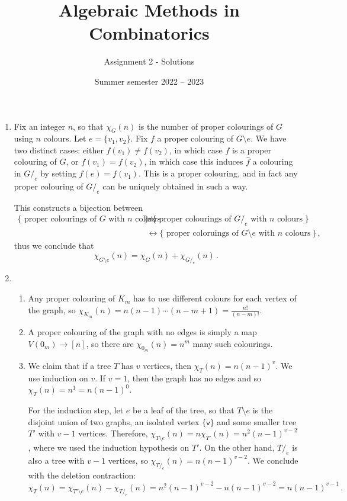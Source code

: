 \documentclass[kulak]{tplt}
\title{Algebraic Methods in Combinatorics}
\author{Assignment 2 - Solutions}
\date{Summer semester 2022 -- 2023}
\theoremstyle{definition}
\newcommand{\vv}{\mathsf{v}}
\begin{document}
\maketitle
\begin{enumerate}
\item 
Fix an integer $n$, so that $\chi_G(n)$ is the number of proper colourings of $G$ using $n$ colours.
Let $e = \{v_1, v_2\}$.
Fix $f$ a proper colouring of $G\setminus e$.
We have two distinct cases: either $f(v_1) \neq f(v_2)$, in which case $f$ is a proper colouring of $G$, or $f(v_1) = f(v_2)$, in which case this induces $\hat{f}$ a colouring in $G/_e$ by setting $f(e) = f(v_1)$.
This is a proper colouring, and in fact any proper colouring of $G/_e$ can be uniquely obtained in such a way.

This constructs a bijection between
\begin{align*}
 \{ \text{ proper colourings of $G$ with $n$ colours }\} &\uplus \{ \text{ proper colourings of $G/_e$ with $n$ colours }\} \\
 &\leftrightarrow \{ \text{ proper coloruings of $G\setminus e$ with $n$ colours }\}\, , 
\end{align*}
thus we conclude that 
$$ \chi_{G\setminus e }(n) = \chi_G(n) + \chi_{G/_e}(n)\, . $$

\item 
\begin{enumerate}
\item 
Any proper colouring of $K_m$ has to use different colours for each vertex of the graph, so $\chi_{K_m}(n) = n(n-1) \cdots (n-m+1) = \frac{n!}{(n-m)!}$.

\item 
A proper colouring of the graph with no edges is simply a map $V(0_m) \to [n]$, so there are $\chi_{0_m}(n) = n^m$ many such colourings.


\item 
We claim that if a tree $T$ has $v$ vertices, then $\chi_T(n) = n(n-1)^v$.
We use induction on $v$.
If $v=1$, then the graph has no edges and so $\chi_T(n) = n^1 = n (n-1)^0$.

For the induction step, let $e$ be a leaf of the tree, so that $T\setminus e$ is the disjoint union of two graphs, an isolated vertex $\{\vv\}$ and some smaller tree $T'$ with $v-1$ vertices.
Therefore, $\chi_{T \setminus e}(n) = n \chi_{T'}(n) = n^2(n-1)^{v-2}$, where we used the induction hypothesis on $T'$.
On the other hand, $T/_e$ is also a tree with $v-1$ vertices, so $\chi_{T/_e}(n) = n (n-1)^{v-2}$.
We conclude with the deletion contraction:
$$\chi_T(n) = \chi_{T'\setminus e}(n) - \chi_{T/_e}(n) = n^2(n-1)^{v-2}  - n(n-1)^{v-2} = n(n-1)^{v-1} \, .  $$



\end{enumerate}
\end{enumerate}
\end{document}
